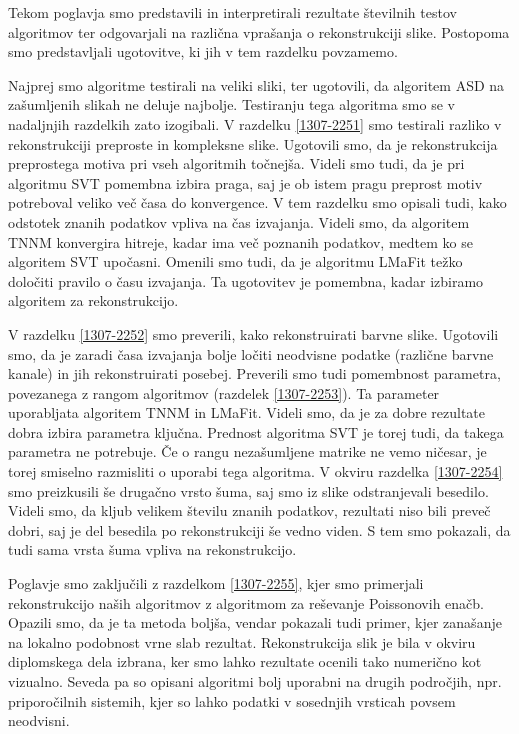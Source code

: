  \label{2107-1444}
Tekom poglavja smo predstavili in interpretirali rezultate številnih testov algoritmov ter odgovarjali na različna vprašanja o rekonstrukciji slike. Postopoma smo predstavljali ugotovitve, ki jih v tem razdelku povzamemo.

Najprej smo algoritme testirali na veliki sliki, ter ugotovili, da algoritem ASD na zašumljenih slikah ne deluje najbolje. Testiranju tega algoritma smo se v nadaljnjih razdelkih zato izogibali. V razdelku \ref{1307-2251} smo testirali razliko v rekonstrukciji preproste in kompleksne slike. Ugotovili smo, da je rekonstrukcija preprostega motiva pri vseh algoritmih točnejša. Videli smo tudi, da je pri algoritmu SVT pomembna izbira praga, saj je ob istem pragu preprost motiv potreboval veliko več časa do konvergence. V tem razdelku smo opisali tudi, kako odstotek znanih podatkov vpliva na čas izvajanja. Videli smo, da algoritem TNNM konvergira hitreje, kadar ima več poznanih podatkov, medtem ko se algoritem SVT upočasni. Omenili smo tudi, da je algoritmu LMaFit težko določiti pravilo o času izvajanja. Ta ugotovitev je pomembna, kadar izbiramo algoritem za rekonstrukcijo.

V razdelku \ref{1307-2252} smo preverili, kako rekonstruirati barvne slike. Ugotovili smo, da je zaradi časa izvajanja bolje ločiti neodvisne podatke (različne barvne kanale) in jih rekonstruirati posebej. Preverili smo tudi pomembnost parametra, povezanega z rangom algoritmov (razdelek \ref{1307-2253}). Ta parameter uporabljata algoritem TNNM in LMaFit. Videli smo, da je za dobre rezultate dobra izbira parametra ključna. Prednost algoritma SVT je torej tudi, da takega parametra ne potrebuje. Če o rangu nezašumljene matrike ne vemo ničesar, je torej smiselno razmisliti o uporabi tega algoritma. V okviru razdelka \ref{1307-2254} smo preizkusili še drugačno vrsto šuma, saj smo iz slike odstranjevali besedilo. Videli smo, da kljub velikem številu znanih podatkov, rezultati niso bili preveč dobri, saj je del besedila po rekonstrukciji še vedno viden. S tem smo pokazali, da tudi sama vrsta šuma vpliva na rekonstrukcijo.

Poglavje smo zaključili z razdelkom \ref{1307-2255}, kjer smo primerjali rekonstrukcijo naših algoritmov z algoritmom za reševanje Poissonovih enačb. Opazili smo, da je ta metoda boljša, vendar pokazali tudi primer, kjer zanašanje na lokalno podobnost vrne slab rezultat. Rekonstrukcija slik je bila v okviru diplomskega dela izbrana, ker smo lahko rezultate ocenili tako numerično kot vizualno. Seveda pa so opisani algoritmi bolj uporabni na drugih področjih, npr. priporočilnih sistemih, kjer so lahko podatki v sosednjih vrsticah povsem neodvisni.  